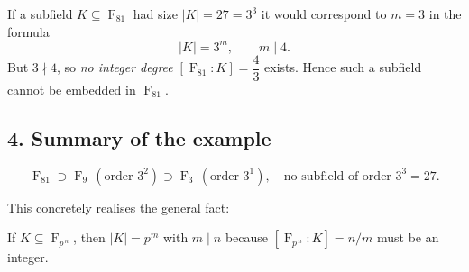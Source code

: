 \documentclass[12pt]{article}
\DeclareMathOperator{\F}{F}
\theoremstyle{definition} %
\theoremstyle{plain} %
\begin{document}
If a subfield \(K\subseteq\F_{81}\) had size \(|K|=27=3^{3}\) it would
correspond to \(m=3\) in the formula
\[
|K|=3^{m},\qquad m\mid 4.
\]
But \(3\nmid 4\), so \emph{no integer degree}
\(
[\F_{81}:K]=\dfrac{4}{3}
\)
exists.  
Hence such a subfield cannot be embedded in \(\F_{81}\).

\subsection*{4.  Summary of the example}

\[
\boxed{
   \F_{81}
   \supset
   \F_{9}\,(\text{order }3^{2})
   \supset
   \F_{3}\,(\text{order }3^{1}),
   \quad
   \text{no subfield of order }3^{3}=27.
}
\]

This concretely realises the general fact:

\begin{center}
If \(K\subseteq\F_{p^{\,n}}\), then \(|K|=p^{m}\) with \(m\mid n\)
because \( [\F_{p^{\,n}}:K]=n/m \) must be an integer.
\end{center}
\end{document}
